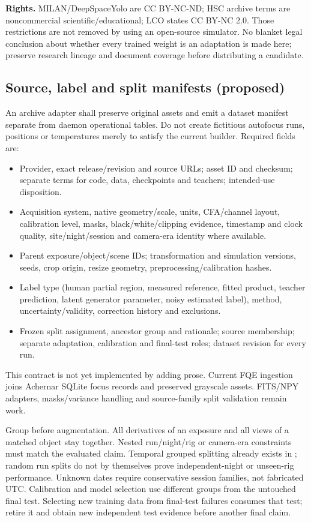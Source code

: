 \documentclass[11pt,a4paper]{article}
\newcommand{\pathref}[1]{\texttt{\path{#1}}}
\begin{document}
\textbf{Rights.} MILAN/DeepSpaceYolo are CC BY-NC-ND; HSC archive terms are
noncommercial scientific/educational; LCO states CC BY-NC 2.0. Those restrictions
are not removed by using an open-source simulator. No blanket legal conclusion
about whether every trained weight is an adaptation is made here; preserve
research lineage and document coverage before distributing a candidate.\cite{milansource,hscpolicy,lcopolicy}

\subsection{Source, label and split manifests (proposed)}
An archive adapter shall preserve original assets and emit a dataset manifest
separate from daemon operational tables. Do not create fictitious autofocus
runs, positions or temperatures merely to satisfy the current builder.
Required fields are:
\begin{itemize}
\item Provider, exact release/revision and source URLs; asset ID and checksum;
separate terms for code, data, checkpoints and teachers; intended-use disposition.
\item Acquisition system, native geometry/scale, units, CFA/channel layout,
calibration level, masks, black/white/clipping evidence, timestamp and clock
quality, site/night/session and camera-era identity where available.
\item Parent exposure/object/scene IDs; transformation and simulation versions,
seeds, crop origin, resize geometry, preprocessing/calibration hashes.
\item Label type (human partial region, measured reference, fitted product,
teacher prediction, latent generator parameter, noisy estimated label), method,
uncertainty/validity, correction history and exclusions.
\item Frozen split assignment, ancestor group and rationale; source membership;
separate adaptation, calibration and final-test roles; dataset revision for every run.
\end{itemize}
This contract is not yet implemented by adding prose. Current FQE ingestion
joins Achernar SQLite focus records and preserved grayscale assets. FITS/NPY
adapters, masks/variance handling and source-family split validation remain work.

Group before augmentation. All derivatives of an exposure and all views of a
matched object stay together. Nested run/night/rig or camera-era constraints
must match the evaluated claim. Temporal grouped splitting already exists in
\pathref{ml/data_pipeline/split_registry.py}; random run splits do not by
 themselves prove independent-night or unseen-rig performance. Unknown dates
require conservative session families, not fabricated UTC. Calibration and
model selection use different groups from the untouched final test. Selecting
new training data from final-test failures consumes that test; retire it and
obtain new independent test evidence before another final claim.
\end{document}
